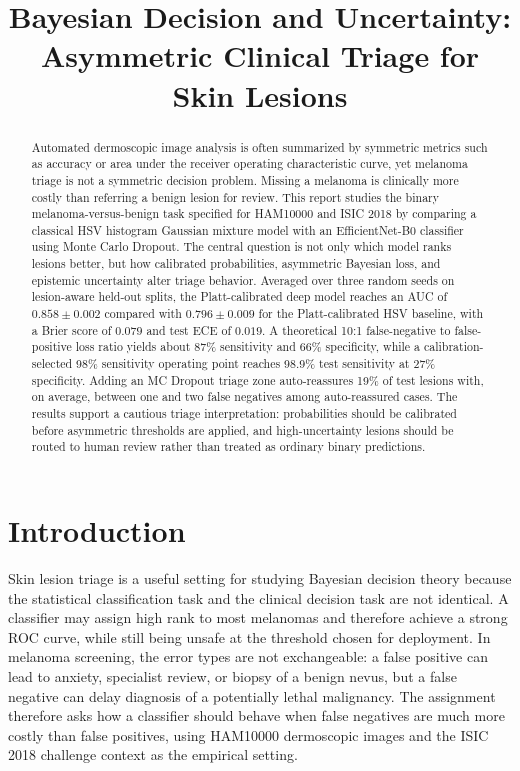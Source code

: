 \documentclass[11pt,a4paper]{article}
\title{Bayesian Decision and Uncertainty:\\Asymmetric Clinical Triage for Skin Lesions}
\author{}
\date{}
\begin{document}
\maketitle

\begin{abstract}

\noindent Automated dermoscopic image analysis is often summarized by symmetric metrics such as accuracy or area under the receiver operating characteristic curve, yet melanoma triage is not a symmetric decision problem. Missing a melanoma is clinically more costly than referring a benign lesion for review. This report studies the binary melanoma-versus-benign task specified for HAM10000 and ISIC 2018 by comparing a classical HSV histogram Gaussian mixture model with an EfficientNet-B0 classifier using Monte Carlo Dropout. The central question is not only which model ranks lesions better, but how calibrated probabilities, asymmetric Bayesian loss, and epistemic uncertainty alter triage behavior. Averaged over three random seeds on lesion-aware held-out splits, the Platt-calibrated deep model reaches an AUC of $0.858 \pm 0.002$ compared with $0.796 \pm 0.009$ for the Platt-calibrated HSV baseline, with a Brier score of $0.079$ and test ECE of $0.019$. A theoretical 10:1 false-negative to false-positive loss ratio yields about 87\% sensitivity and 66\% specificity, while a calibration-selected 98\% sensitivity operating point reaches 98.9\% test sensitivity at 27\% specificity. Adding an MC Dropout triage zone auto-reassures 19\% of test lesions with, on average, between one and two false negatives among auto-reassured cases. The results support a cautious triage interpretation: probabilities should be calibrated before asymmetric thresholds are applied, and high-uncertainty lesions should be routed to human review rather than treated as ordinary binary predictions.
\end{abstract}

\section{Introduction}

Skin lesion triage is a useful setting for studying Bayesian decision theory because the statistical classification task and the clinical decision task are not identical. A classifier may assign high rank to most melanomas and therefore achieve a strong ROC curve, while still being unsafe at the threshold chosen for deployment. In melanoma screening, the error types are not exchangeable: a false positive can lead to anxiety, specialist review, or biopsy of a benign nevus, but a false negative can delay diagnosis of a potentially lethal malignancy. The assignment therefore asks how a classifier should behave when false negatives are much more costly than false positives, using HAM10000 dermoscopic images and the ISIC 2018 challenge context as the empirical setting.
\end{document}
